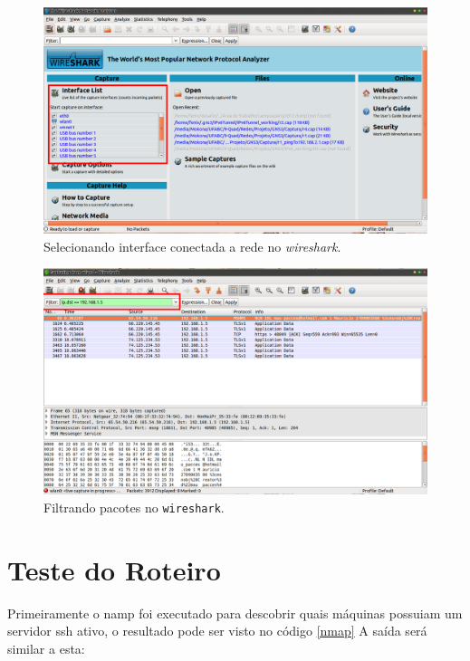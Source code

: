 \documentclass[12pt]{abnt}
\begin{document}
\begin{figure}[!hbt]
  \centering
  \includegraphics[scale=0.3]{Wireshark-s}
  \caption[Wireshark-s]{Selecionando interface conectada a rede no \textit{wireshark}.}
  \label{wireshark}
\end{figure}

\begin{figure}[!hbt]
  \centering
  \includegraphics[scale=0.3]{Wireshark-cap}
  \caption[Wireshark-cap]{Filtrando pacotes no \texttt{wireshark}.}
  \label{captura}
\end{figure}




\chapter{Teste do Roteiro}
Primeiramente o namp foi executado para descobrir quais máquinas possuiam um servidor
ssh ativo, o resultado pode ser visto no código \ref{nmap}
A saída será similar a esta:

\renewcommand{\baselinestretch}{0.5}  %
\begin{codigo}[!hbt]
   \tiny  %
   \caption{Resultado o nmap.}
   \label{nmap}
\end{codigo}
\end{document}
